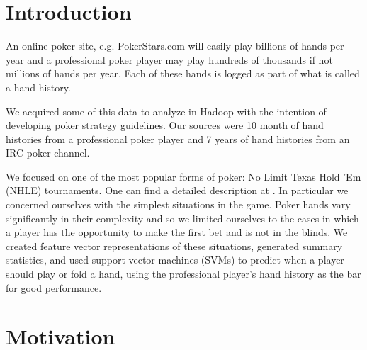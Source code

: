 \documentclass[twoside]{article}
\begin{document}
\begin{multicols}{2} %

\section{Introduction}
An online poker site, e.g. PokerStars.com will easily play billions of hands per year and a professional poker player may play hundreds of thousands if not millions of hands per year. Each of these hands is logged as part of what is called a hand history.

We acquired some of this data to analyze in Hadoop with the intention of developing poker strategy guidelines. Our sources were 10 month of hand histories from a professional poker player and 7 years of hand histories from an IRC poker channel. 

We focused on one of the most popular forms of poker: No Limit Texas Hold 'Em (NHLE) tournaments. One can find a detailed description at \cite{TexasHoldem}. In particular we concerned ourselves with the simplest situations in the game. Poker hands vary significantly in their complexity and so we limited ourselves to the cases in which a player has the opportunity to make the first bet and is not in the blinds. We created feature vector representations of these situations, generated summary statistics, and used support vector machines (SVMs) to predict when a player should play or fold a hand, using the professional player's hand history as the bar for good performance.




\section{Motivation}


\end{multicols}
\end{document}
